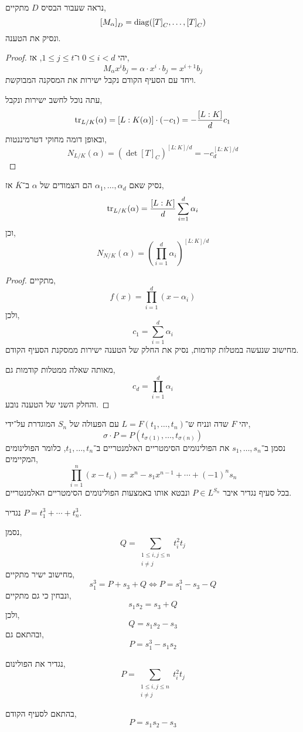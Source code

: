 \subquestion{}
נראה שעבור הבסיס $D$ מתקיים,
\[
	{[ M_{\alpha} ]}_D
	= \operatorname{diag}({[T]}_C, \ldots, {[T]}_C)
\]
ונסיק את הטענה.
\begin{proof}
	יהי $0 \le i < d$ ו־$1 \le j \le t$, אז,
	\[
		M_{\alpha} x^i b_j
		= \alpha \cdot x^i \cdot b_j
		= x^{i + 1} b_j
	\]
	ויחד עם הסעיף הקודם נקבל ישירות את המסקנה המבוקשת.

	עתה נוכל לחשב ישירות ונקבל,
	\[
		\operatorname{tr}_{L / K}(\alpha)
		= [L : K(\alpha)] \cdot (-c_1)
		= - \frac{[L : K]}{d} c_1
	\]
	ובאופן דומה מחוקי דטרמיננטות,
	\[
		N_{L / K}(\alpha)
		= {(\det {[T]}_C)}^{[L : K] / d}
		= -c_d^{[L : K] / d}
	\]
\end{proof}

\subquestion{}
נסיק שאם $\alpha_1, \ldots, \alpha_d$ הם הצמודים של $\alpha$ ב־$\overline{K}$ אז,
\[
	\operatorname{tr}_{L / K}(\alpha) = \frac{[L : K]}{d} \sum_{i = 1}^d \alpha_i
\]
וכן,
\[
	N_{N / K}(\alpha)
	= {\left(\prod_{i = 1}^d \alpha_i\right)}^{[L : K] / d}
\]
\begin{proof}
	מתקיים,
	\[
		f(x) = \prod_{i = 1}^d (x - \alpha_i)
	\]
	ולכן,
	\[
		c_1
		= \sum_{i = 1}^d \alpha_i
	\]
	מחישוב שנעשה במטלות קודמות, נסיק את החלק של הטענה ישירות ממסקנת הסעיף הקודם.

	מאותה שאלה ממטלות קודמות גם,
	\[
		c_d
		= \prod_{i = 1}^d \alpha_i
	\]
	והחלק השני של הטענה נובע.
\end{proof}

\question{}
יהי $F$ שדה ונניח ש־$L = F(t_1, \ldots, t_n)$ עם הפעולה של $S_n$ המוגדרת על־ידי,
\[
	\sigma \cdot P
	= P(t_{\sigma(1)}, \ldots, t_{\sigma(n)})
\]
נסמן ב־$s_1, \ldots, s_n$ את הפולינומים הסימטריים האלמנטריים ב־$t_1, \ldots, t_n$,
כלומר הפולינומים המקיימים,
\[
	\prod_{i = 1}^n (x - t_i)
	= x^n - s_1 x^{n - 1} + \cdots + {(-1)}^n s_n
\]
בכל סעיף נגדיר איבר $P \in L^{S_n}$ ונבטא אותו באמצעות הפולינומים הסימטריים האלמנטריים.

\subquestion{}
נגדיר $P = t_1^3 + \cdots + t_n^3$.
\begin{solution}
	נסמן,
	\[
		Q = \sum_{\substack{1 \le i, j \le n \\ i \ne j}} t_i^2 t_j
	\]
	מחישוב ישיר מתקיים,
	\[
		s_1^3
		= P + s_3 + Q
		\iff P = s_1^3 - s_3 - Q
	\]
	ונבחין כי גם מתקיים,
	\[
		s_1 s_2
		= s_3 + Q
	\]
	ולכן,
	\[
		Q = s_1 s_2 - s_3
	\]
	ובהתאם גם,
	\[
		P
		= s_1^3 - s_1 s_2
	\]
\end{solution}

\subquestion{}
נגדיר את הפולינום,
\[
	P
	= \sum_{\substack{1 \le i, j \le n \\ i \ne j}} t_i^2 t_j
\]
\begin{solution}
	בהתאם לסעיף הקודם,
	\[
		P = s_1 s_2 - s_3
	\]
\end{solution}

